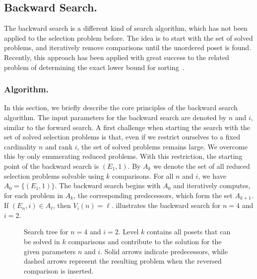\documentclass[a4paper,UKenglish,cleveref, autoref, thm-restate]{lipics-v2021}
\begin{document}
\subsection{Backward Search.} \label{sec:backward}
The backward search is a different kind of search algorithm, which has not been applied to the selection problem before.
The idea is to start with the set of solved problems, and iteratively remove comparisons until the unordered poset is found.
Recently, this approach has been applied with great success to the related problem of determining the exact lower bound for sorting~\cite{stober2022lower}.

\subsubsection{Algorithm.} \label{sec:backward:algorithm}
In this section, we briefly describe the core principles of the backward search algorithm.
The input parameters for the backward search are denoted by $n$ and $i$, similar to the forward search.
A first challenge when starting the search with the set of solved selection problems is that, even if we restrict ourselves to a fixed cardinality $n$ and rank $i$, the set of solved problems remains large.
We overcome this by only enumerating reduced problems.
With this restriction, the starting point of the backward search is $(E_1, 1)$.
By $A_k$ we denote the set of all reduced selection problems solvable using $k$ comparisons.
For all $n$ and $i$, we have $A_0 = \{(E_1, 1)\}$.
The backward search begins with $A_0$ and iteratively computes, for each problem in $A_k$, the corresponding predecessors, which form the set $A_{k + 1}$.
If $(E_n, i) \in A_\ell$, then $V_i(n) = \ell$.
 illustrates the backward search for $n = 4$ and $i = 2$.

\begin{figure}[t]
  \centering
  
  \caption{Search tree for $n = 4$ and $i = 2$.
  Level $k$ contains all posets that can be solved in $k$ comparisons and contribute to the solution for the given parameters $n$ and $i$.
  Solid arrows indicate predecessors, while dashed arrows represent the resulting problem when the reversed comparison is inserted.}
  \label{fig:backward-search-tree}
\end{figure}
\end{document}
